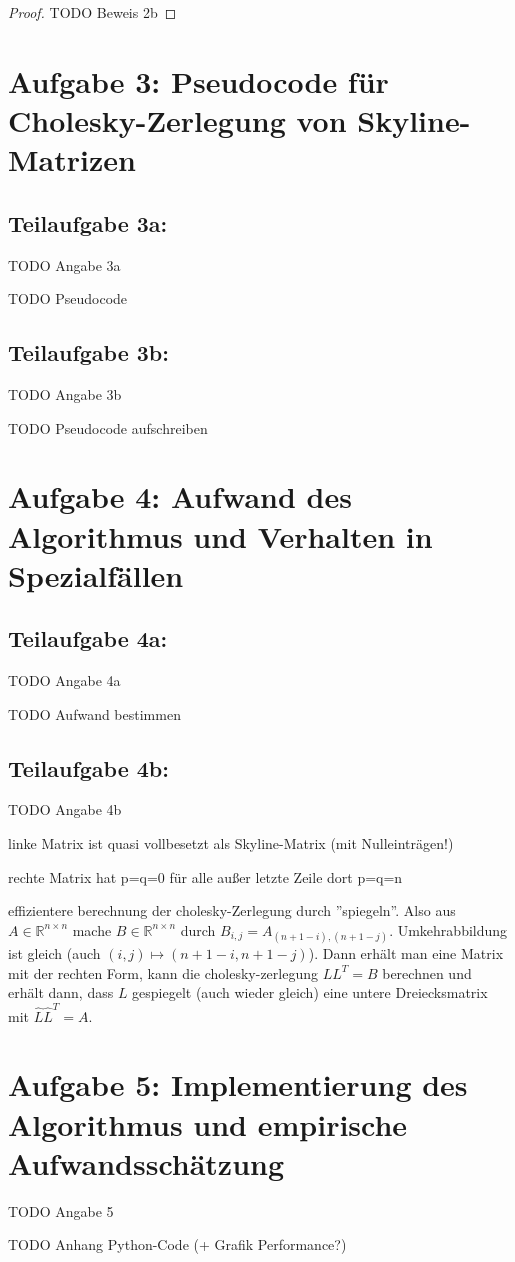 \documentclass[]{article}
\begin{document}
\begin{proof}
	TODO Beweis 2b
\end{proof}

\section*{Aufgabe 3: Pseudocode für Cholesky-Zerlegung von Skyline-Matrizen}
\subsection{Teilaufgabe 3a:}
TODO Angabe 3a

TODO Pseudocode

\subsection*{Teilaufgabe 3b:}
TODO Angabe 3b

TODO Pseudocode aufschreiben

\section*{Aufgabe 4: Aufwand des Algorithmus und Verhalten in Spezialfällen}
\subsection*{Teilaufgabe 4a:}
TODO Angabe 4a

TODO Aufwand bestimmen

\subsection*{Teilaufgabe 4b:}
TODO Angabe 4b

linke Matrix ist quasi vollbesetzt als Skyline-Matrix (mit Nulleinträgen!)

rechte Matrix hat p=q=0 für alle außer letzte Zeile dort p=q=n

effizientere berechnung der cholesky-Zerlegung durch ''spiegeln''. Also aus $A \in \mathbb{R}^{n\times n}$ mache $B \in \mathbb{R}^{n\times n}$ durch $B_{i,j} = A_{(n+1-i),(n+1-j)}$. Umkehrabbildung ist gleich (auch $(i, j) \mapsto (n+1-i, n+1-j)$). Dann erhält man eine Matrix mit der rechten Form, kann die cholesky-zerlegung $LL^T=B$ berechnen und erhält dann, dass $L$ gespiegelt (auch wieder gleich) eine untere Dreiecksmatrix mit $\hat{L}\hat{L}^T=A$.

\section*{Aufgabe 5: Implementierung des Algorithmus und empirische Aufwandsschätzung}
TODO Angabe 5

TODO Anhang Python-Code (+ Grafik Performance?)
\end{document}
